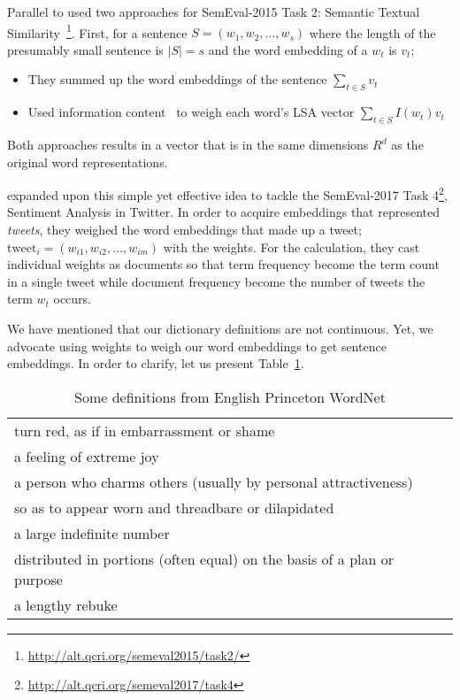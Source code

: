 Parallel to
\textcite{zhao_ecnu_2015} used two approaches for SemEval-2015 Task 2: Semantic Textual Similarity~\footnote{\url{http://alt.qcri.org/semeval2015/task2/}}.
First, for a sentence $S = (w_{1}, w_{2}, \dots, w_{s})$ where the length of the presumably small sentence is $|S| = s$ and the word embedding of a $w_t$ is $v_t$;
\begin{itemize}
    \item They summed up the word embeddings of the sentence $\sum_{t \in S}v_{t}$
    \item Used information content~\cite{saric_takelab_2012} to weigh each word's LSA vector $\sum_{t \in S} I(w_t) v_{t}$
\end{itemize}
Both approaches results in a vector that is in the same dimensions $R^{d}$ as the original word representations.

\textcite{edilson_a._correa_nilc-usp_2017} expanded upon this simple yet effective idea to tackle the SemEval-2017 Task 4\footnote{\url{http://alt.qcri.org/semeval2017/task4}}, Sentiment Analysis in Twitter.
In order to acquire embeddings that represented \emph{tweets}, they weighed the word embeddings that made up a tweet; $\text{tweet}_i = (w_{i1}, w_{i2}, \dots, w_{im})$ with the \tfidf{} weights.
For the \tfidf{} calculation, they cast individual weights as documents so that term frequency become the term count in a single tweet while document frequency become the number of tweets the term $w_t$ occurs.

We have mentioned that our dictionary definitions are not continuous.
Yet, we advocate using \tfidf{} weights to weigh our word embeddings to get sentence embeddings.
In order to clarify, let us present Table~\ref{tab:en_it_examples}.
\begin{table}
    \centering
    \caption{Some definitions from English Princeton WordNet}%
    \label{tab:en_it_examples}
    \begin{tabular}{l}
        \toprule
        turn red, as if in embarrassment or shame \\
        a feeling of extreme joy \\
        a person who charms others (usually by personal attractiveness) \\
        so as to appear worn and threadbare or dilapidated \\
        a large indefinite number \\
        distributed in portions (often equal) on the basis of a plan or purpose \\
        a lengthy rebuke \\
        \bottomrule
    \end{tabular}
\end{table}

